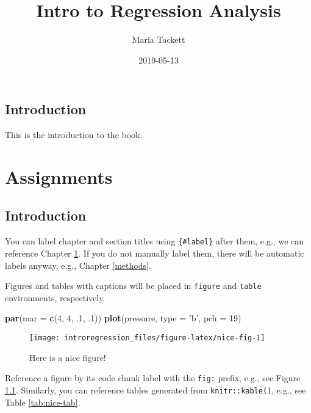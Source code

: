 \documentclass[]{book}
\title{Intro to Regression Analysis}
\author{Maria Tackett}
\date{2019-05-13}
\newenvironment{Shaded}{\begin{snugshade}}{\end{snugshade}}
\newcommand{\KeywordTok}[1]{\textcolor[rgb]{0.13,0.29,0.53}{\textbf{#1}}}
\newcommand{\DataTypeTok}[1]{\textcolor[rgb]{0.13,0.29,0.53}{#1}}
\newcommand{\DecValTok}[1]{\textcolor[rgb]{0.00,0.00,0.81}{#1}}
\newcommand{\StringTok}[1]{\textcolor[rgb]{0.31,0.60,0.02}{#1}}
\newcommand{\NormalTok}[1]{#1}
\begin{document}
\maketitle

{
\hypersetup{linkcolor=black}
\setcounter{tocdepth}{1}
\tableofcontents
}
\listoftables
\listoffigures
\chapter{Introduction}\label{introduction}

This is the introduction to the book.

\part{Assignments}\label{part-assignments}

\chapter{Introduction}\label{intro}

You can label chapter and section titles using \texttt{\{\#label\}}
after them, e.g., we can reference Chapter \ref{intro}. If you do not
manually label them, there will be automatic labels anyway, e.g.,
Chapter \ref{methods}.

Figures and tables with captions will be placed in \texttt{figure} and
\texttt{table} environments, respectively.

\begin{Shaded}
\begin{Highlighting}[]
\KeywordTok{par}\NormalTok{(}\DataTypeTok{mar =} \KeywordTok{c}\NormalTok{(}\DecValTok{4}\NormalTok{, }\DecValTok{4}\NormalTok{, .}\DecValTok{1}\NormalTok{, .}\DecValTok{1}\NormalTok{))}
\KeywordTok{plot}\NormalTok{(pressure, }\DataTypeTok{type =} \StringTok{'b'}\NormalTok{, }\DataTypeTok{pch =} \DecValTok{19}\NormalTok{)}
\end{Highlighting}
\end{Shaded}

\begin{figure}

{\centering \texttt{[image: introregression\_files/figure-latex/nice-fig-1]} 

}

\caption{Here is a nice figure!}\label{fig:nice-fig}
\end{figure}

Reference a figure by its code chunk label with the \texttt{fig:}
prefix, e.g., see Figure \ref{fig:nice-fig}. Similarly, you can
reference tables generated from \texttt{knitr::kable()}, e.g., see Table
\ref{tab:nice-tab}.
\end{document}
